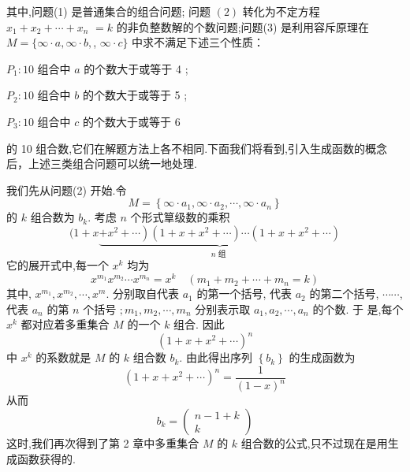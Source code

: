 \documentclass{report}
\begin{document}
其中,问题(1) 是普通集合的组合问题; 问题 $(2)$ 转化为不定方程 $x_{1}+x_{2}+\cdots+x_{n}$ $=k$ 的非负整数解的个数问题;问题(3) 是利用容斥原理在 $M=\{\infty \cdot a, \infty \cdot b,$, $\infty \cdot c\}$ 中求不满足下述三个性质：

$P_{1}: 10$ 组合中 $a$ 的个数大于或等于 4 ;

$P_{2}: 10$ 组合中 $b$ 的个数大于或等于 5 ;

$P_{3}: 10$ 组合中 $c$ 的个数大于或等于 6

的 10 组合数,它们在解题方法上各不相同.下面我们将看到,引入生成函数的概念 后，上述三类组合问题可以统一地处理.

我们先从问题(2) 开始.令
$$
M=\left\{\infty \cdot a_{1}, \infty \cdot a_{2}, \cdots, \infty \cdot a_{n}\right\}
$$
的 $k$ 组合数为 $b_{k}$. 考虑 $n$ 个形式筸级数的乘积
$$
(1+x \underbrace{\left.+x^{2}+\cdots\right)\left(1+x+x^{2}+\cdots\right) \cdots\left(1+x+x^{2}+\cdots\right)}_{n \text { 组 }}
$$
它的展开式中,每一个 $x^{k}$ 均为
$$
x^{m_{1}} x^{m_{2}} \cdots x^{m_{n}}=x^{k} \quad\left(m_{1}+m_{2}+\cdots+m_{n}=k\right)
$$
其中, $x^{m_{1}}, x^{m_{2}}, \cdots, x^{m}$. 分别取自代表 $a_{1}$ 的第一个括号, 代表 $a_{2}$ 的第二个括号, $\cdots \cdots$, 代表 $a_{n}$ 的第 $n$ 个括号 $; m_{1}, m_{2}, \cdots, m_{n}$ 分别表示取 $a_{1}, a_{2}, \cdots, a_{n}$ 的个数. 于 是,每个 $x^{k}$ 都对应着多重集合 $M$ 的一个 $k$ 组合. 因此
$$
\left(1+x+x^{2}+\cdots\right)^{n}
$$
中 $x^{k}$ 的系数就是 $M$ 的 $k$ 组合数 $b_{k}$. 由此得出序列 $\left\{b_{k}\right\}$ 的生成函数为
$$
\left(1+x+x^{2}+\cdots\right)^{n}=\frac{1}{(1-x)^{n}}
$$
从而
$$
b_{k}=\left(\begin{array}{c}
n-1+k \\
k
\end{array}\right)
$$
这时,我们再次得到了第 2 章中多重集合 $M$ 的 $k$ 组合数的公式,只不过现在是用生成函数获得的.
\end{document}
